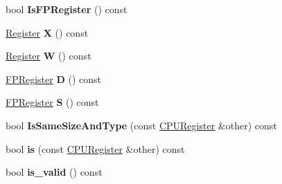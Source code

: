 \begin{DoxyCompactItemize}
\item 
bool {\bfseries Is\+F\+P\+Register} () const \hypertarget{structv8_1_1internal_1_1_c_p_u_register_a770cc1833c8905d3fc35cf892a01ba15}{}\label{structv8_1_1internal_1_1_c_p_u_register_a770cc1833c8905d3fc35cf892a01ba15}

\item 
\hyperlink{structv8_1_1internal_1_1_register}{Register} {\bfseries X} () const \hypertarget{structv8_1_1internal_1_1_c_p_u_register_a4c78352b2eb02ab57f83ee41cc788a82}{}\label{structv8_1_1internal_1_1_c_p_u_register_a4c78352b2eb02ab57f83ee41cc788a82}

\item 
\hyperlink{structv8_1_1internal_1_1_register}{Register} {\bfseries W} () const \hypertarget{structv8_1_1internal_1_1_c_p_u_register_a772488a5283e480b7b1be726508e29c5}{}\label{structv8_1_1internal_1_1_c_p_u_register_a772488a5283e480b7b1be726508e29c5}

\item 
\hyperlink{structv8_1_1internal_1_1_f_p_register}{F\+P\+Register} {\bfseries D} () const \hypertarget{structv8_1_1internal_1_1_c_p_u_register_ad32da2565a108e58266179fa7b3378bb}{}\label{structv8_1_1internal_1_1_c_p_u_register_ad32da2565a108e58266179fa7b3378bb}

\item 
\hyperlink{structv8_1_1internal_1_1_f_p_register}{F\+P\+Register} {\bfseries S} () const \hypertarget{structv8_1_1internal_1_1_c_p_u_register_ac6c2980f040496b73742506f476a955a}{}\label{structv8_1_1internal_1_1_c_p_u_register_ac6c2980f040496b73742506f476a955a}

\item 
bool {\bfseries Is\+Same\+Size\+And\+Type} (const \hyperlink{structv8_1_1internal_1_1_c_p_u_register}{C\+P\+U\+Register} \&other) const \hypertarget{structv8_1_1internal_1_1_c_p_u_register_a442757c3aa434e9be7b7105e92e9da62}{}\label{structv8_1_1internal_1_1_c_p_u_register_a442757c3aa434e9be7b7105e92e9da62}

\item 
bool {\bfseries is} (const \hyperlink{structv8_1_1internal_1_1_c_p_u_register}{C\+P\+U\+Register} \&other) const \hypertarget{structv8_1_1internal_1_1_c_p_u_register_a886191e04de0a8bc831c9122c70124e0}{}\label{structv8_1_1internal_1_1_c_p_u_register_a886191e04de0a8bc831c9122c70124e0}

\item 
bool {\bfseries is\+\_\+valid} () const \hypertarget{structv8_1_1internal_1_1_c_p_u_register_a457bb8f46355a4b72706edaa50047e68}{}\label{structv8_1_1internal_1_1_c_p_u_register_a457bb8f46355a4b72706edaa50047e68}

\end{DoxyCompactItemize}
